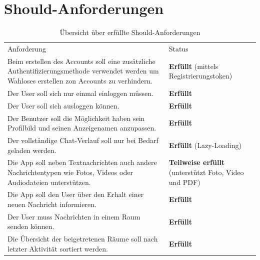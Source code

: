     \newpage
    \section{Should-Anforderungen}\label{sec:should-anforderungen}
    \begin{table}[h]
        \centering
        \begin{tabular}{p{}|p{}}
            Anforderung & Status\\
            \cline{1-2}
            Beim erstellen des Accounts soll eine zusätzliche Authentifizierungsmethode verwendet werden um Wahloses erstellen zon Accounts zu verhindern.
            &  \textbf{Erfüllt} (mittels Registrierungstoken)\\
            \cline{1-2}
            Der User soll sich nur einmal einloggen müssen. &  \textbf{Erfüllt} \\
            \cline{1-2}
            Der User soll sich ausloggen können. & \textbf{Erfüllt}  \\
            \cline{1-2}
            Der Benutzer soll die Möglichkeit haben sein Profilbild und seinen Anzeigenamen anzupassen. &  \textbf{Erfüllt} \\
            \cline{1-2}
            Der vollständige Chat-Verlauf soll nur bei Bedarf geladen werden. & \textbf{Erfüllt} (Lazy-Loading)\\
            \cline{1-2}
            Die App soll neben Textnachrichten auch andere Nachrichtentypen wie Fotos, Videos oder Audiodateien unterstützen. & \textbf{Teilweise erfüllt} (unterstützt Foto, Video und PDF) \\
            \cline{1-2}
            Die App soll den User über den Erhalt einer neuen Nachricht informieren. & \textbf{Erfüllt} \\
            \cline{1-2}
            Der User muss Nachrichten in einem Raum senden können. & \textbf{Erfüllt} \\
            \cline{1-2}
            Die Übersicht der beigetretenen Räume soll nach letzter Aktivität sortiert werden. & \textbf{Erfüllt}
        \end{tabular}
        \caption{Übersicht über erfüllte Should-Anforderungen}
        \label{tab:erfüllte-should-anforderungen}
    \end{table}

    \newpage
